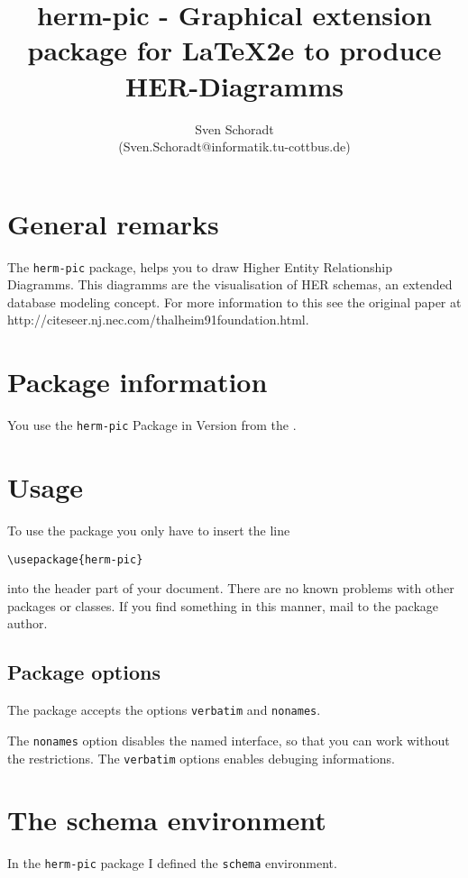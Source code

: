 \documentclass[a4paper,11pt]{article}
\author{Sven Schoradt \\ (Sven.Schoradt@informatik.tu-cottbus.de)}
\title{herm-pic - Graphical extension package for LaTeX2e to produce HER-Diagramms}
\begin{document}
\maketitle

\section{General remarks}

The {\tt herm-pic} package, helps you to draw Higher Entity Relationship Diagramms.
This diagramms are the visualisation of HER schemas, an extended database modeling 
concept. For more information to this see the original paper at 
http://citeseer.nj.nec.com/thalheim91foundation.html.

\section{Package information}

You use the {\tt herm-pic} Package in Version \HERMpicRev{} from the \HERMpicDate.

\section{Usage}

To use the package you only have to insert the line

\begin{verbatim}
\usepackage{herm-pic}
\end{verbatim}

into the header part of your document. There are no known problems with other
packages or classes. If you find something in this manner, mail to the package 
author.

\subsection{Package options}

The package accepts the options {\tt verbatim} and {\tt nonames}.

The {\tt nonames} option disables the named interface, so that you can work without
the restrictions. The {\tt verbatim} options enables debuging informations.

\section{The schema environment}

In the {\tt herm-pic} package I defined the {\tt schema} environment.
\end{document}
